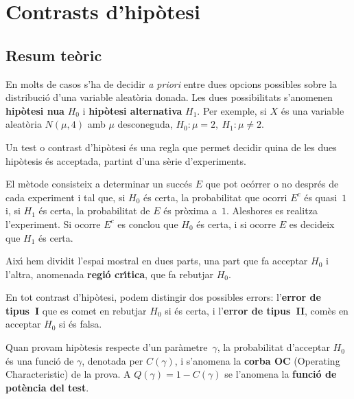 \chapter{Contrasts d'hip\`otesi}

\section{Resum te\`oric}

En molts de casos s'ha de decidir {\it a priori} entre dues opcions possibles 
sobre la distribuci\'o d'una variable aleat\`oria donada. 
Les dues possibilitats s'anomenen {\bf hip\`otesi nu{\lgem}a} 
$H_0$ i 
{\bf hip\`otesi alternativa} $H_1$.
 Per exemple, si
$X$ \'es una variable aleat\`oria $N(\mu,4)$ amb $\mu$ desconeguda, 
$H_0: \mu = 2, \ H_1: \mu \not = 2$.

Un test o contrast d'hip\`otesi 
\'es una regla que permet decidir quina de les dues
hip\`otesis \'es acceptada, partint d'una s\`erie d'experiments.

El m\`etode consisteix a determinar un succ\'es $E$ que pot oc\'orrer o no 
despr\'es de cada experiment i tal que, si $H_0$ \'es certa, 
la probabilitat que ocorri $E^c$ \'es quasi~$1$ i, si $H_1$ \'es certa, 
la probabilitat de $E$ \'es pr\`oxima a~$1$.
Aleshores es realitza l'experiment. Si ocorre $E^c$ es conclou que $H_0$ \'es
certa, i si ocorre $E$ es decideix que $H_1$ \'es certa.

Aix\'{\i} hem dividit l'espai mostral en dues parts, una part que fa 
acceptar $H_0$ i l'altra, anomenada {\bf regi\'o cr\'{\i}tica}, que fa rebutjar $H_0$.

En tot contrast d'hip\`otesi, podem distingir dos possibles errors: 
l'{\bf error de tipus~I} que es comet en rebutjar $H_0$ si \'es certa, i 
l'{\bf error de tipus~II}, com\`es en acceptar $H_0$ si \'es falsa.

Quan provam hip\`otesis respecte d'un par\`ametre~$\gamma$,
 la probabilitat
d'acceptar $H_0$ \'es una funci\'o de $\gamma$, denotada per $C(\gamma)$, i
s'anomena la {\bf corba OC} (Operating Characteristic) de la prova. A $Q(\gamma)
= 1 - C(\gamma)$ se l'anomena la {\bf funci\'o de pot\`encia del test}.

